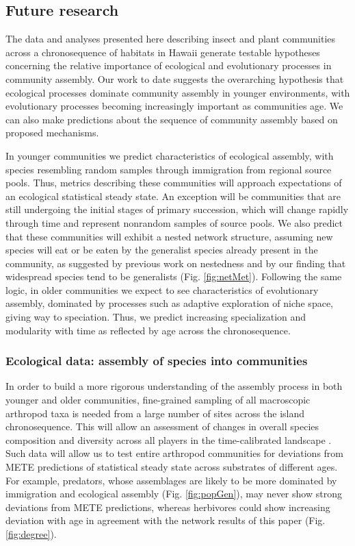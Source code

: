 \subsection{Future research}

The data and analyses presented here describing insect and plant
communities across a chronosequence of habitats in Hawaii generate
testable hypotheses concerning the relative importance of ecological
and evolutionary processes in community assembly. Our work to date
suggests the overarching hypothesis that ecological processes dominate
community assembly in younger environments, with evolutionary
processes becoming increasingly important as communities age. We can
also make predictions about the sequence of community assembly based
on proposed mechanisms.

In younger communities we predict characteristics of ecological
assembly, with species resembling random samples through immigration
from regional source pools. Thus, metrics describing these communities
will approach expectations of an ecological statistical steady
state. An exception will be communities that are still undergoing the
initial stages of primary succession, which will change rapidly
through time and represent nonrandom samples of source pools. We also
predict that these communities will exhibit a nested network
structure, assuming new species will eat or be eaten by the generalist
species already present in the community, as suggested by previous
work on nestedness \citep{bascompte2007} and by our finding that widespread
species tend to be generalists (Fig. \ref{fig:netMet}).  Following the same logic, in
older communities we expect to see characteristics of evolutionary
assembly, dominated by processes such as adaptive exploration of niche
space, giving way to speciation. Thus, we predict increasing
specialization and modularity with time \citep{bascompte2007,
donatti2011, nuismer2013} as reflected by age across the
chronosequence.


\subsubsection{Ecological data: assembly of species into communities}

In order to build a more rigorous understanding of the assembly
process in both younger and older communities, fine-grained sampling
of all macroscopic arthropod taxa is needed from a large number of
sites across the island chronosequence. This will allow an assessment
of changes in overall species composition and diversity across all
players in the time-calibrated landscape \citep{gruner2007}. Such data
will allow us to test entire arthropod communities for deviations from
METE predictions of statistical steady state \citep{harte2011} across
substrates of different ages. For example, predators, whose
assemblages are likely to be more dominated by immigration and
ecological assembly (Fig. \ref{fig:popGen}), may never show strong
deviations from METE predictions, whereas herbivores could show
increasing deviation with age in agreement with the network results of
this paper (Fig. \ref{fig:degree}).


